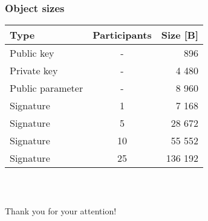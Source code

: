 \documentclass[%
  14pt,       				%
	t,                  %
	aspectratio=1610,   %
	unicode,						%
]{beamer}				    	%
\begin{document}
\begin{frame}[c]
	\frametitle{Object sizes}
	\large{
		\begin{table}[htbp]
			\centering
			\begin{tabular}{|l|c|r|}
				\hline
				Type             & Participants & Size [B] \\
				\hline
				Public key       & -            & 896      \\
				Private key      & -            & 4 480    \\
				Public parameter & -            & 8 960    \\
				Signature        & 1            & 7 168    \\
				Signature        & 5            & 28 672   \\
				Signature        & 10           & 55 552   \\
				Signature        & 25           & 136 192  \\
				\hline
			\end{tabular}
		\end{table}
	}
	
	
\end{frame}

\begin{frame}[c]
	\frametitle{\mbox{ }}
	\begin{center}
		{\Huge Thank you for your attention!}
	\end{center}
\end{frame}
\end{document}
